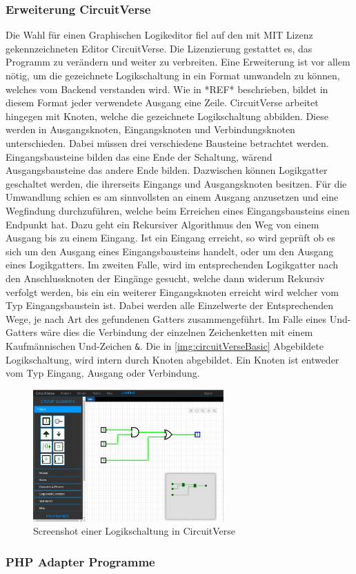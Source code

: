 \subsubsection{Erweiterung CircuitVerse}
Die Wahl für einen Graphischen Logikeditor fiel auf den mit MIT Lizenz gekennzeichneten Editor CircuitVerse. Die Lizenzierung gestattet es, das Programm zu verändern und weiter zu verbreiten. Eine Erweiterung ist vor allem nötig, um die gezeichnete Logikschaltung in ein Format umwandeln zu können, welches vom Backend verstanden wird. Wie in *REF* beschrieben, bildet in diesem Format jeder verwendete Ausgang eine Zeile. CircuitVerse arbeitet hingegen mit Knoten, welche die gezeichnete Logikschaltung abbilden. Diese werden in Ausgangsknoten, Eingangsknoten und Verbindungsknoten unterschieden. Dabei müssen drei verschiedene Bausteine betrachtet werden. Eingangsbausteine bilden das eine Ende der Schaltung, wärend Ausgangsbausteine das andere Ende bilden. Dazwischen können Logikgatter geschaltet werden, die ihrerseits Eingangs und Ausgangsknoten besitzen. Für die Umwandlung schien es am sinnvollsten an einem Ausgang anzusetzen und eine Wegfindung durchzuführen, welche beim Erreichen eines Eingangsbausteins einen Endpunkt hat. Dazu geht ein Rekursiver Algorithmus den Weg von einem Ausgang bis zu einem Eingang. Ist ein Eingang erreicht, so wird geprüft ob es sich um den Ausgang eines Eingangsbausteins handelt, oder um den Ausgang eines Logikgatters. Im zweiten Falle, wird im entsprechenden Logikgatter nach den Anschlussknoten der Eingänge gesucht, welche dann widerum Rekursiv verfolgt werden, bis ein ein weiterer Eingangsknoten erreicht wird welcher vom Typ Eingangsbaustein ist. Dabei werden alle Einzelwerte der Entsprechenden Wege, je nach Art des gefundenen Gatters zusammengeführt. Im Falle eines Und-Gatters wäre dies die Verbindung der einzelnen Zeichenketten mit einem Kaufmännischen Und-Zeichen \texttt{\&}.
Die in \autoref{img:circuitVerseBasic} Abgebildete Logikschaltung, wird intern durch Knoten abgebildet. Ein Knoten ist entweder vom Typ Eingang, Ausgang oder Verbindung. 

\begin{figure}[H]
	\begin{center}
		\includegraphics[width=0.65\textwidth ,clip]{./images/circuitverse.jpg}
		\caption{Screenshot einer Logikschaltung in CircuitVerse}
		\label{img:circuitVerseBasic}
	\end{center} 
\end{figure}	



\subsubsection{PHP Adapter Programme}

 
\clearpage
